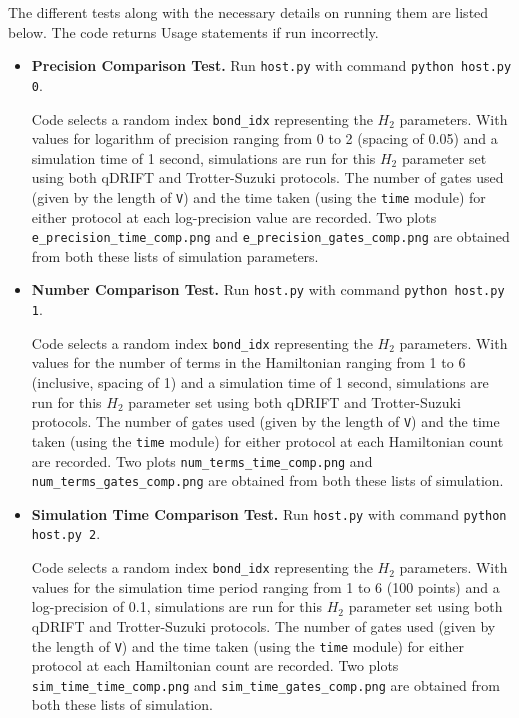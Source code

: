 \documentclass[letterpaper, 11pt]{article}
\begin{document}
The different tests along with the necessary details on running them are listed below. The code returns Usage statements if run incorrectly.
\begin{itemize}
\item 
\textbf{Precision Comparison Test. } Run \texttt{host.py} with command \texttt{python host.py 0}.

Code selects a random index \texttt{bond\_idx} representing the $H_2$ parameters. With values for logarithm of precision ranging from 0 to 2 (spacing of 0.05) and a simulation time of 1 second, simulations are run for this $H_2$ parameter set using both qDRIFT and Trotter-Suzuki protocols. The number of gates used (given by the length of \texttt{V}) and the time taken (using the \texttt{time} module) for either protocol at each log-precision value are recorded. Two plots \texttt{e\_precision\_time\_comp.png} and \texttt{e\_precision\_gates\_comp.png} are obtained from both these lists of simulation parameters.

\item 
\textbf{Number Comparison Test. } Run \texttt{host.py} with command \texttt{python host.py 1}.

Code selects a random index \texttt{bond\_idx} representing the $H_2$ parameters. With values for the number of terms in the Hamiltonian ranging from 1 to 6 (inclusive, spacing of 1) and a simulation time of 1 second, simulations are run for this $H_2$ parameter set using both qDRIFT and Trotter-Suzuki protocols. The number of gates used (given by the length of \texttt{V}) and the time taken (using the \texttt{time} module) for either protocol at each Hamiltonian count are recorded. Two plots \texttt{num\_terms\_time\_comp.png} and \texttt{num\_terms\_gates\_comp.png} are obtained from both these lists of simulation.

\item 
\textbf{Simulation Time Comparison Test. } Run \texttt{host.py} with command \texttt{python host.py 2}.

Code selects a random index \texttt{bond\_idx} representing the $H_2$ parameters. With values for the simulation time period ranging from 1 to 6 (100 points) and a log-precision of 0.1, simulations are run for this $H_2$ parameter set using both qDRIFT and Trotter-Suzuki protocols. The number of gates used (given by the length of \texttt{V}) and the time taken (using the \texttt{time} module) for either protocol at each Hamiltonian count are recorded. Two plots \texttt{sim\_time\_time\_comp.png} and \texttt{sim\_time\_gates\_comp.png} are obtained from both these lists of simulation.
\end{itemize}
\end{document}
